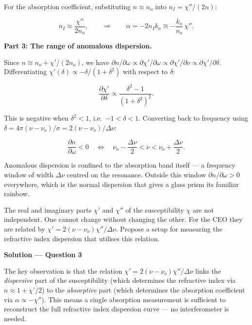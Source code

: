For the absorption coefficient, substituting $n \approx n_o$ into $n_I = \chi''/(2n)$:

\begin{equation*}
  n_I \approx \frac{\chi''}{2n_o},
  \qquad\Longrightarrow\qquad \alpha = -2n_I k_o \cong -\frac{k_o}{n_o}\,\chi''.
\end{equation*}

\textbf{Part 3: The range of anomalous dispersion.}

Since $n \cong n_o + \chi'/(2n_o)$, we have $\partial n/\partial\omega \propto \partial\chi'/\partial\omega \propto \partial\chi'/\partial\nu \propto \partial\chi'/\partial\delta$. Differentiating $\chi'(\delta) \propto -\delta/(1+\delta^2)$ with respect to $\delta$:

\begin{equation*}
  \frac{\partial\chi'}{\partial\delta} \propto \frac{\delta^2 - 1}{(1+\delta^2)^2}.
\end{equation*}

This is negative when $\delta^2 < 1$, i.e.\ $-1 < \delta < 1$. Converting back to frequency using $\delta = 4\pi(\nu - \nu_o)/\sigma = 2(\nu-\nu_o)/\Delta\nu$:

\begin{equation*}
  \boxed{\frac{\partial n}{\partial\omega} < 0 \quad\Longleftrightarrow\quad
  \nu_o - \frac{\Delta\nu}{2} < \nu < \nu_o + \frac{\Delta\nu}{2}.}
\end{equation*}

Anomalous dispersion is confined to the absorption band itself — a frequency window of width $\Delta\nu$ centred on the resonance. Outside this window $\partial n/\partial\omega > 0$ everywhere, which is the normal dispersion that gives a glass prism its familiar rainbow.


\begin{question}[Question 3]The real and imaginary parts $\chi'$ and $\chi''$ of the susceptibility
$\chi$ are not independent. One cannot change without changing the other. For the CEO they are
related by $\chi'=2(\nu-\nu_{o})\chi''/\Delta\nu$. Propose a setup for measuring the refractive
index dispersion that utilises this relation.
\end{question}

\textbf{\large Solution --- Question 3}

The key observation is that the relation $\chi' = 2(\nu-\nu_o)\chi''/\Delta\nu$ links the \emph{dispersive} part of the susceptibility (which determines the refractive index via $n \approx 1 + \chi'/2$) to the \emph{absorptive} part (which determines the absorption coefficient via $\alpha \propto -\chi''$). This means a single absorption measurement is sufficient to reconstruct the full refractive index dispersion curve --- no interferometer is needed.

